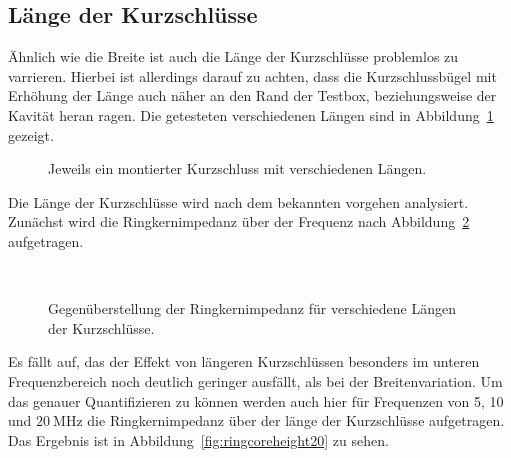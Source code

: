 \subsection{L\"ange der Kurzschl\"usse}
\"Ahnlich wie die Breite ist auch die L\"ange der Kurzschl\"usse problemlos zu varrieren. Hierbei ist allerdings darauf zu achten, dass die Kurzschlussb\"ugel mit Erh\"ohung der L\"ange auch n\"aher an den Rand der Testbox, beziehungsweise der Kavit\"at heran ragen. Die getesteten verschiedenen L\"angen sind in Abbildung~\ref{fig:ringcoreheightCST} gezeigt.
\begin{figure}[htb]
	\centering
	\hspace{0.05\textwidth}
	\hspace{0.05\textwidth}
	\caption{Jeweils ein montierter Kurzschluss mit verschiedenen L\"angen.}
	\label{fig:ringcoreheightCST}
\end{figure}
\par 
Die L\"ange der Kurzschl\"usse wird nach dem bekannten vorgehen analysiert. Zun\"achst wird die Ringkernimpedanz \"uber der Frequenz nach Abbildung~\ref{fig:ringcoreheight} aufgetragen.
\begin{figure}[htb]
	\centering
	\\
	\caption{Gegen\"uberstellung der Ringkernimpedanz f\"ur verschiedene L\"angen der Kurzschl\"usse.}
	\label{fig:ringcoreheight}
\end{figure}
\par
Es f\"allt auf, das der Effekt von l\"angeren Kurzschl\"ussen besonders im unteren Frequenzbereich noch deutlich geringer ausf\"allt, als bei der Breitenvariation. Um das genauer Quantifizieren zu k\"onnen werden auch hier f\"ur Frequenzen von 5, 10 und $\SI{20}{\mega\hertz}$ die Ringkernimpedanz \"uber der l\"ange der Kurzschl\"usse aufgetragen. Das Ergebnis ist in Abbildung~\ref{fig:ringcoreheight20} zu sehen.




\newpage



